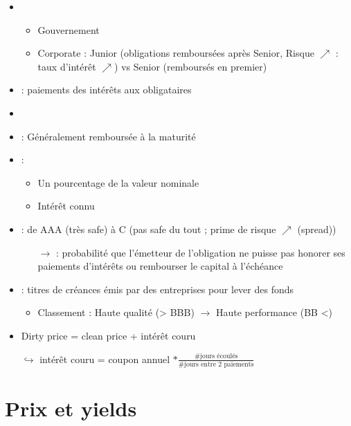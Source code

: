 \begin{itemize}
    \item {}
    \begin{itemize}
        \item Gouvernement
        \item Corporate : Junior (obligations remboursées après Senior, Risque $\nearrow$ : taux d'intérêt $\nearrow$) vs Senior (remboursés en premier)
    \end{itemize}
    \item {} : paiements des intérêts aux obligataires
    \item {}
    \item {} : Généralement remboursée à la maturité
    \item {} :
    \begin{itemize}
        \item Un pourcentage de la valeur nominale
        \item Intérêt connu
    \end{itemize}
    \item {} : de AAA (très safe) à C (pas safe du tout ; prime de risque $\nearrow$ (spread))
    \begin{itemize}
        \item[$\rightarrow$]  : probabilité que l'émetteur de l'obligation ne puisse pas honorer ses paiements d'intérêts ou rembourser le capital à l'échéance
    \end{itemize}
    \item {} : titres de créances émis par des entreprises pour lever des fonds
    \begin{itemize}
        \item Classement : Haute qualité (> BBB) $\rightarrow$ Haute performance (BB <)
    \end{itemize}
    \item Dirty price = clean price + intérêt couru
    \item[$\hookrightarrow$] intérêt couru = coupon annuel $* \frac{\text{\# jours écoulés}}{\text{\# jours entre 2 paiements}}$
\end{itemize}

\section{Prix et yields}

